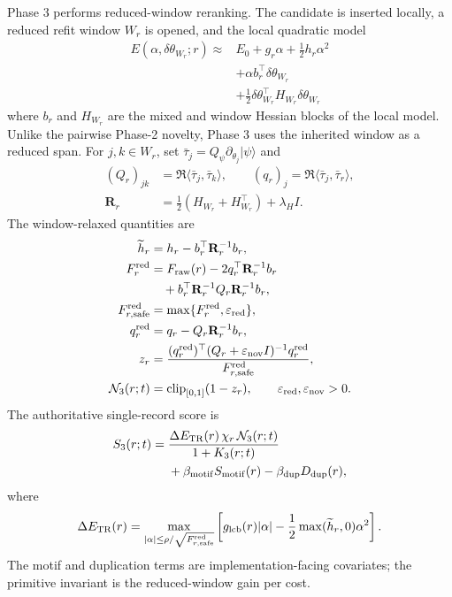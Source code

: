 \documentclass[
  reprint,
  amsmath,
  amssymb,
  aps,
  pra,
  nofootinbib,
  superscriptaddress,
  floatfix
]{revtex4-2}
\newcommand{\TR}{\mathrm{TR}}
\newcommand{\eps}{\varepsilon}
\newcommand{\ket}[1]{|#1\rangle}
\begin{document}
Phase 3 performs reduced-window reranking. The candidate is inserted locally, a reduced refit window $W_r$ is opened, and the local quadratic model
\begin{equation}
\begin{split}
E(\alpha,\delta\theta_{W_r};r)\approx{}&E_0+g_r\alpha+\frac12h_r\alpha^2 \\
&+\alpha b_r^{\top}\delta\theta_{W_r} \\
&+\frac12\delta\theta_{W_r}^{\top}H_{W_r}\delta\theta_{W_r}
\end{split}
\label{eq:local_quadratic}
\end{equation}
where $b_r$ and $H_{W_r}$ are the mixed and window Hessian blocks of the local model. Unlike the pairwise Phase-2 novelty, Phase 3 uses the inherited window as a reduced span. For $j,k\in W_r$, set $\bar\tau_j=Q_\psi\partial_{\theta_j}\ket{\psi}$ and
\begin{align*}
(Q_r)_{jk}&=\Re\langle\bar\tau_j,\bar\tau_k\rangle,
\qquad
(q_r)_j=\Re\langle\bar\tau_j,\bar\tau_r\rangle,\\
\mathbf R_r&=\frac12(H_{W_r}+H_{W_r}^{\top})+\lambda_H I .
\end{align*}
The window-relaxed quantities are
\begin{align*}
\widetilde h_r&=h_r-b_r^{\top}\mathbf R_r^{-1}b_r,\\
F_r^{\rm red}&=F_{\rm raw}(r)-2q_r^{\top}\mathbf R_r^{-1}b_r\\
&\quad
+b_r^{\top}\mathbf R_r^{-1}Q_r\mathbf R_r^{-1}b_r,\\
F_{r,{\rm safe}}^{\rm red}&=\max\{F_r^{\rm red},\eps_{\rm red}\},\\
q_r^{\rm red}&=q_r-Q_r\mathbf R_r^{-1}b_r,\\
z_r&=\frac{(q_r^{\rm red})^{\top}(Q_r+\eps_{\rm nov}I)^{-1}q_r^{\rm red}}
{F_{r,{\rm safe}}^{\rm red}},\\
\mathcal N_3(r;t)&=\operatorname{clip}_{[0,1]}(1-z_r),
\qquad \eps_{\rm red},\eps_{\rm nov}>0 .
\end{align*}
The authoritative single-record score is
\begin{equation}
\begin{split}
S_3(r;t)={}&\frac{\Delta E_{\TR}(r)\,\chi_r\,\mathcal N_3(r;t)}{1+K_3(r;t)} \\
&+\beta_{\rm motif}S_{\rm motif}(r)-\beta_{\rm dup}D_{\rm dup}(r),
\end{split}
\label{eq:phase3_score}
\end{equation}
where
\begin{equation}
\Delta E_{\TR}(r)=
\max_{|\alpha|\le \rho/\sqrt{F_{r,{\rm safe}}^{\rm red}}}
\left[g_{\rm lcb}(r)|\alpha|-\frac12\max(\widetilde h_r,0)\alpha^2\right].
\label{eq:phase3_gain}
\end{equation}
The motif and duplication terms are implementation-facing covariates; the primitive invariant is the reduced-window gain per cost.
\end{document}
